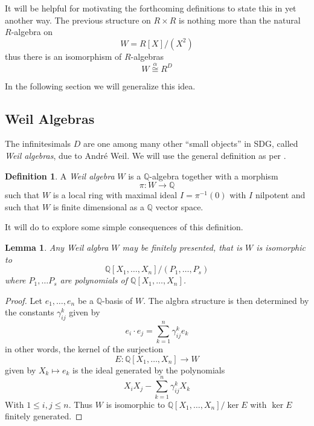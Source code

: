 \documentclass[11pt]{article}
\newtheorem{lemma}{Lemma}[section]
\theoremstyle{definition}
\newtheorem{defn}{Definition}[section]
\newcommand{\quot}[2]{#1/#2} %
\numberwithin{equation}{section}
\begin{document}
It will be helpful for motivating the forthcoming definitions to state this in yet another way. The previous structure on \( R\times R \) is nothing more than the natural \( R \)-algebra on
\[
  W = \quot{R[X]}{(X^2)}
\]
thus there is an isomorphism of \( R \)-algebras
\[
  W \stackrel{\alpha}{\cong} R^D
\]

In the following section we will generalize this idea.

\subsection{Weil Algebras}

The infinitesimals \( D \) are one among many other ``small objects'' in SDG, called \emph{Weil algebras}, due to André Weil. We will use the general definition as per \cite{bun17}.

\begin{defn}
  A \emph{Weil algebra} \( W \) is a \( \mathbb{Q} \)-algebra together with a morphism
  \[
    \pi: W\to\mathbb Q
  \]
  such that \( W \) is a local ring with maximal ideal \( I=\pi^{-1}(0) \) with \( I \) nilpotent and such that \( W \) is finite dimensional as a \( \mathbb{Q} \) vector space.
\end{defn}

It will do to explore some simple consequences of this definition.

\begin{lemma}
  Any Weil algbra \( W \) may be finitely presented, that is \( W \) is isomorphic to
  \[
    \mathbb{Q}[X_1,\dots,X_n]/(P_1,\dots,P_s)
  \]
  where \( P_1,\dots P_s \) are polynomials of \( \mathbb{Q}[X_1,\dots,X_n] \).
  \label{lm:finpr}
\end{lemma}

\begin{proof}
  Let \( e_1,\dots,e_n \) be a \( \mathbb{Q} \)-basis of \( W \). The algbra structure is then determined by the constants \( \gamma_{ij}^k \) given by
  \[
    e_i\cdot e_j = \sum_{k=1}^n \gamma_{ij}^ke_k
  \]
  in other words, the kernel of the surjection
  \[
    E: \mathbb{Q}[X_1,\dots,X_n]\to W
  \]
  given by \( X_k\mapsto e_k \) is the ideal generated by the polynomials
  \[
    X_iX_j - \sum_{k=1}^n\gamma_{ij}^kX_k
  \]
  With \( 1\leq i,j\leq n \). Thus \( W \) is isomorphic to \( \mathbb{Q}[X_1,\dots,X_n]/\ker E \) with \( \ker E \) finitely generated.
\end{proof}


\clearpage


\end{document}
